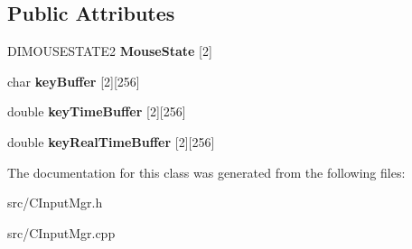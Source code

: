 \subsection*{Public Attributes}
\begin{DoxyCompactItemize}
\item 
\hypertarget{class_c_input_mgr_a95f93364095950ddf30b7dd7e8409576}{
DIMOUSESTATE2 {\bfseries MouseState} \mbox{[}2\mbox{]}}
\label{class_c_input_mgr_a95f93364095950ddf30b7dd7e8409576}

\item 
\hypertarget{class_c_input_mgr_a9a18bdac602f94bbddcac7057cef077a}{
char {\bfseries keyBuffer} \mbox{[}2\mbox{]}\mbox{[}256\mbox{]}}
\label{class_c_input_mgr_a9a18bdac602f94bbddcac7057cef077a}

\item 
\hypertarget{class_c_input_mgr_ab7d3610bc0e2b369b0f34527f8989ab3}{
double {\bfseries keyTimeBuffer} \mbox{[}2\mbox{]}\mbox{[}256\mbox{]}}
\label{class_c_input_mgr_ab7d3610bc0e2b369b0f34527f8989ab3}

\item 
\hypertarget{class_c_input_mgr_a13df5a4856032c0e819d049b33970c11}{
double {\bfseries keyRealTimeBuffer} \mbox{[}2\mbox{]}\mbox{[}256\mbox{]}}
\label{class_c_input_mgr_a13df5a4856032c0e819d049b33970c11}

\end{DoxyCompactItemize}


The documentation for this class was generated from the following files:\begin{DoxyCompactItemize}
\item 
src/CInputMgr.h\item 
src/CInputMgr.cpp\end{DoxyCompactItemize}
